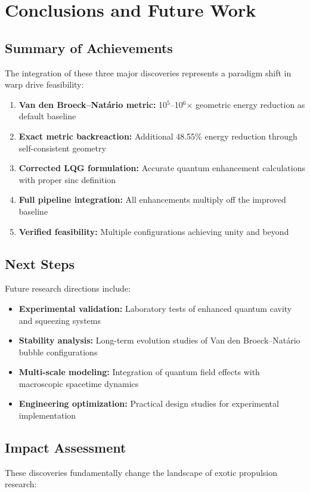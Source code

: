 \documentclass[11pt]{article}
\begin{document}
\section{Conclusions and Future Work}

\subsection{Summary of Achievements}
The integration of these three major discoveries represents a paradigm shift in warp drive feasibility:

\begin{enumerate}
\item \textbf{Van den Broeck–Natário metric:} 10$^5$–10$^6$× geometric energy reduction as default baseline
\item \textbf{Exact metric backreaction:} Additional 48.55\% energy reduction through self-consistent geometry
\item \textbf{Corrected LQG formulation:} Accurate quantum enhancement calculations with proper sinc definition
\item \textbf{Full pipeline integration:} All enhancements multiply off the improved baseline
\item \textbf{Verified feasibility:} Multiple configurations achieving unity and beyond
\end{enumerate}

\subsection{Next Steps}
Future research directions include:

\begin{itemize}
\item \textbf{Experimental validation:} Laboratory tests of enhanced quantum cavity and squeezing systems
\item \textbf{Stability analysis:} Long-term evolution studies of Van den Broeck–Natário bubble configurations
\item \textbf{Multi-scale modeling:} Integration of quantum field effects with macroscopic spacetime dynamics
\item \textbf{Engineering optimization:} Practical design studies for experimental implementation
\end{itemize}

\subsection{Impact Assessment}
These discoveries fundamentally change the landscape of exotic propulsion research:
\end{document}

